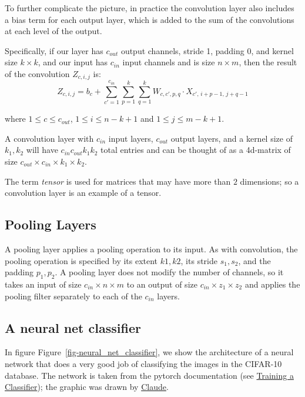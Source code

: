 \documentclass[
  11pt,
  letterpaper,
]{scrbook}
\theoremstyle{plain}
\theoremstyle{remark}
\begin{document}
To further complicate the picture, in practice the convolution layer
also includes a bias term for each output layer, which is added to the
sum of the convolutions at each level of the output.

Specifically, if our layer has \(c_{out}\) output channels, stride 1,
padding 0, and kernel size \(k\times k\), and our input has \(c_{in}\)
input channels and is size \(n\times m\), then the result of the
convolution \(Z_{c,i,j}\) is: \[
Z_{c,i,j} = b_c + \sum_{c'=1}^{c_{in}} \sum_{p=1}^{k} \sum_{q=1}^{k} W_{c,c',p,q} \cdot X_{c',\, i+p-1,\, j+q-1}
\]

where \(1\le c\le c_{out}\), \(1\le i\le n-k+1\) and
\(1\le j\le m-k+1\).

A convolution layer with \(c_{in}\) input layers, \(c_{out}\) output
layers, and a kernel size of \(k_1,k_2\) will have
\(c_{in}c_{out}k_1 k_2\) total entries and can be thought of as a
4d-matrix of size \(c_{out}\times c_{in}\times k_{1}\times k_{2}\).

The term \emph{tensor} is used for matrices that may have more than
\(2\) dimensions; so a convolution layer is an example of a tensor.

\hypertarget{pooling-layers}{%
\subsection{Pooling Layers}\label{pooling-layers}}

A pooling layer applies a pooling operation to its input. As with
convolution, the pooling operation is specified by its extent \(k1,k2\),
its stride \(s_1,s_2\), and the padding \(p_1,p_2\). A pooling layer
does not modify the number of channels, so it takes an input of size
\(c_{in}\times n\times m\) to an output of size
\(c_{in}\times z_{1}\times z_{2}\) and applies the pooling filter
separately to each of the \(c_{in}\) layers.

\hypertarget{a-neural-net-classifier}{%
\subsection{A neural net classifier}\label{a-neural-net-classifier}}

In figure Figure~\ref{fig-neural_net_classifier}, we show the
architecture of a neural network that does a very good job of
classifying the images in the CIFAR-10 database. The network is taken
from the pytorch documentation (see
\href{https://docs.pytorch.org/tutorials/beginner/blitz/cifar10_tutorial.html}{Training
a Classifier}); the graphic was drawn by
\href{https://claude.ai}{Claude}.
\end{document}

